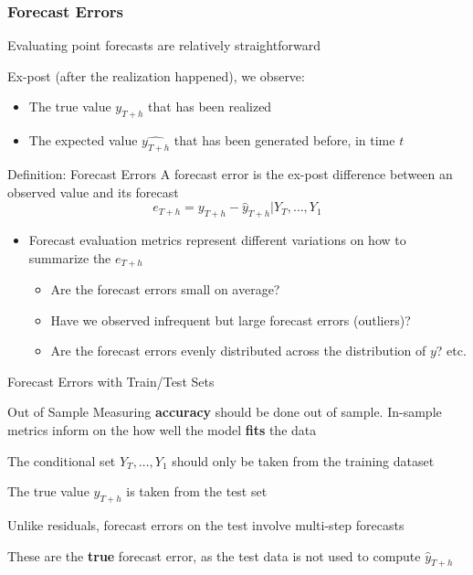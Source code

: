 \documentclass{beamer}
\newenvironment{wideitemize}{\itemize\addtolength{\itemsep}{10pt}}{\enditemize}
\begin{document}
\begin{frame}
  \frametitle{Forecast Errors}
  \begin{wideitemize}
    \item Evaluating point forecasts are relatively straightforward
    \item Ex-post (after the realization happened), we observe:
      \begin{itemize}
      \item The true value $y_{T+h}$ that has been realized 
      \item The expected value $\hat{y_{T+h}}$ that has been generated before, in time $t$
      \end{itemize}
    \end{wideitemize}
      
  \begin{block}{Definition: Forecast Errors}
    A forecast error is the ex-post difference between an observed value and its forecast
    \begin{equation*}
      e_{T+h} = y_{T+h} - \hat{y}_{T+h}|Y_T, \dots, Y_1
    \end{equation*}
  \end{block}

  \begin{itemize}
  \item Forecast evaluation metrics represent different variations on how to summarize the $e_{T+h}$
    \begin{itemize}
    \item Are the forecast errors small on average? 
    \item Have we observed infrequent but large forecast errors (outliers)?
    \item Are the forecast errors evenly distributed across the distribution of $y$? etc.
    \end{itemize}
    
  \end{itemize}

\end{frame}


\begin{frame}{Forecast Errors with Train/Test Sets}

  \begin{alertblock}{Out of Sample}
    Measuring \textbf{accuracy} should be done out of sample. In-sample metrics inform on the how well the model \textbf{fits} the data
  \end{alertblock}
  
\begin{wideitemize}
    \item The conditional set $Y_T, \dots, Y_1$ should only be taken from the training dataset
    \item The true value $y_{T+h}$ is taken from the test set
    \item Unlike residuals, forecast errors on the test involve multi-step forecasts
    \item These are the \textbf{true} forecast error, as the test data is not used to compute $\hat{y}_{T+h}$
  \end{wideitemize}
  
\end{frame}
\end{document}
